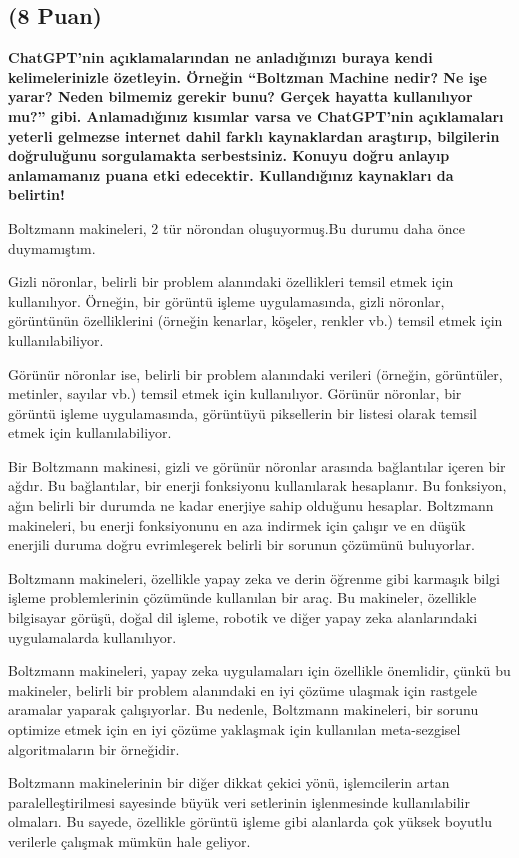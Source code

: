 \documentclass[11pt]{article}
\begin{document}
\subsection{(8 Puan)} \textbf{ChatGPT’nin açıklamalarından ne anladığınızı buraya kendi kelimelerinizle özetleyin. Örneğin ``Boltzman Machine nedir? Ne işe yarar? Neden bilmemiz gerekir bunu? Gerçek hayatta kullanılıyor mu?'' gibi. Anlamadığınız kısımlar varsa ve ChatGPT’nin açıklamaları yeterli gelmezse internet dahil farklı kaynaklardan araştırıp, bilgilerin doğruluğunu sorgulamakta serbestsiniz. Konuyu doğru anlayıp anlamamanız puana etki edecektir. Kullandığınız kaynakları da belirtin!}

Boltzmann makineleri, 2 tür nörondan oluşuyormuş.Bu durumu daha önce duymamıştım.

Gizli nöronlar, belirli bir problem alanındaki özellikleri temsil etmek için kullanılıyor. Örneğin, bir görüntü işleme uygulamasında, gizli nöronlar, görüntünün özelliklerini (örneğin kenarlar, köşeler, renkler vb.) temsil etmek için kullanılabiliyor.

Görünür nöronlar ise, belirli bir problem alanındaki verileri (örneğin, görüntüler, metinler, sayılar vb.) temsil etmek için kullanılıyor. Görünür nöronlar, bir görüntü işleme uygulamasında, görüntüyü piksellerin bir listesi olarak temsil etmek için kullanılabiliyor.

Bir Boltzmann makinesi, gizli ve görünür nöronlar arasında bağlantılar içeren bir ağdır. Bu bağlantılar, bir enerji fonksiyonu kullanılarak hesaplanır. Bu fonksiyon, ağın belirli bir durumda ne kadar enerjiye sahip olduğunu hesaplar. Boltzmann makineleri, bu enerji fonksiyonunu en aza indirmek için çalışır ve en düşük enerjili duruma doğru evrimleşerek belirli bir sorunun çözümünü buluyorlar.

Boltzmann makineleri, özellikle yapay zeka ve derin öğrenme gibi karmaşık bilgi işleme problemlerinin çözümünde kullanılan bir araç. Bu makineler, özellikle bilgisayar görüşü, doğal dil işleme, robotik ve diğer yapay zeka alanlarındaki uygulamalarda kullanılıyor. 

Boltzmann makineleri, yapay zeka uygulamaları için özellikle önemlidir, çünkü bu makineler, belirli bir problem alanındaki en iyi çözüme ulaşmak için rastgele aramalar yaparak çalışıyorlar. Bu nedenle, Boltzmann makineleri, bir sorunu optimize etmek için en iyi çözüme yaklaşmak için kullanılan meta-sezgisel algoritmaların bir örneğidir.

Boltzmann makinelerinin bir diğer dikkat çekici yönü, işlemcilerin artan paralelleştirilmesi sayesinde büyük veri setlerinin işlenmesinde kullanılabilir olmaları. Bu sayede, özellikle görüntü işleme gibi alanlarda çok yüksek boyutlu verilerle çalışmak mümkün hale geliyor.
\end{document}
